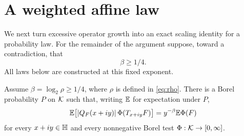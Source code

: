 \section{A weighted affine law}\label{sec:law}

We next turn excessive operator growth into an exact scaling identity
for a probability law. For the remainder of the argument suppose,
toward a contradiction, that
\begin{equation}\label{eq:contrary}
 \beta\ge1/4.
\end{equation}
All laws below are constructed at this fixed exponent.

\begin{proposition}\label{prop:law}
Assume \(\beta=\log_2\rho\ge1/4\), where \(\rho\) is defined in
\eqref{eq:rho}. There is a Borel probability \(P\) on \(\mathcal K\) such that, writing
\(\mathbb E\) for expectation under \(P\),
\begin{equation}\label{eq:law}
 \mathbb E\bigl[|Q_F(x+iy)|\,\Phi(T_{x+iy}F)\bigr]
 =y^{-\beta}\mathbb E\Phi(F)
\end{equation}
for every \(x+iy\in\mathbb H\) and every nonnegative Borel test
\(\Phi:\mathcal K\to[0,\infty]\).
\end{proposition}
